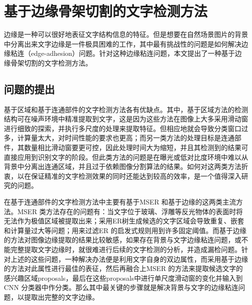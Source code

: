 ﻿%
%
%
%
%
%

\chapter{基于边缘骨架切割的文字检测方法}
\label{sec.c3}

    边缘是一种可以很好地表征文字结构信息的特征。但是想要在自然场景图片的背景中分离出来文字边缘是一件极具困难的工作，其中最有挑战性的问题是如何解决边缘粘连（edge-adhesion）问题。针对这种边缘粘连问题，本文提出了一种基于边缘骨架切割的文字检测方法。

    \section{问题的提出}

    基于区域和基于连通部件的文字检测方法各有优缺点。其中，基于区域方法的检测结构可在噪声环境中精准提取到文字，这是因为这些方法在图像上大多采用滑动窗进行细致的探索，并执行多尺度的处理来提取特征。但相应地就会导致分类窗口过多，计算量太大，对时间性能的要求也更高；而另一类方法的处理目标是连通部件，其数量相比滑动窗要更可控，因此处理时间大为缩短，并且其检测到的结果可直接应用到识别文字的阶段。但此类方法的问题是在曝光或低对比度环境中难以从背景中分离出连通区域，并且过于依赖图像分割算法的结果。如何对这两类方法折衷，以在保证精准的文字检测效果的同时还能达到较高的效率，是一个值得深入研究的问题。

    在基于连通部件的文字检测方法中主要有基于MSER 和基于边缘的这两类主流方法。MSER 类方法存在的问题有：当文字位于玻璃、浮雕等反光物体的表面时将无法作为极值区域被提取出来；采用ER树生成候选的文字区域会导致重复、嵌套和计算量过大等问题；用来过滤ER 的启发式规则用到许多固定阈值。而基于边缘的方法对图像边缘提取的结果比较敏感，如果存在背景与文字边缘粘连问题，或不能完整提取文字边缘时，就很难进行后续的文字检测的分析，并造成漏检问题。针对上述的这些问题，一种解决办法便是利用文字自身的双边属性，而采用基于边缘的方法对此属性进行最佳的表征，然后再融合上MSER 的方法来提取候选文字的感兴趣区域proposals，最后在这些proposals中进行单尺度滑动窗的变化并输入到CNN 分类器中作分类。那么其中最关键的步骤就是解决背景与文字的边缘粘连问题，以提取出完整的文字边缘。

